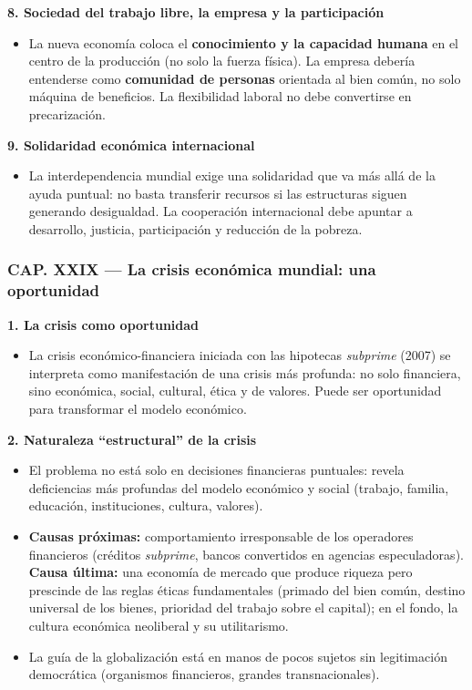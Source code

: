 \documentclass[10pt,a4paper]{article}
\begin{document}
\medskip\noindent \textbf{8. Sociedad del trabajo libre, la empresa y la participación}\par\nopagebreak
\begin{itemize}
\item La nueva economía coloca el \textbf{conocimiento y la capacidad humana} en el centro de la producción (no solo la fuerza física). La empresa debería entenderse como \textbf{comunidad de personas} orientada al bien común, no solo máquina de beneficios. La flexibilidad laboral no debe convertirse en precarización.
\end{itemize}

\medskip\noindent \textbf{9. Solidaridad económica internacional}\par\nopagebreak
\begin{itemize}
\item La interdependencia mundial exige una solidaridad que va más allá de la ayuda puntual: no basta transferir recursos si las estructuras siguen generando desigualdad. La cooperación internacional debe apuntar a desarrollo, justicia, participación y reducción de la pobreza.
\end{itemize}



\subsubsection{CAP. XXIX --- La crisis económica mundial: una oportunidad}

\medskip\noindent \textbf{1. La crisis como oportunidad}\par\nopagebreak
\begin{itemize}
\item La crisis económico-financiera iniciada con las hipotecas \textit{subprime} (2007) se interpreta como manifestación de una crisis más profunda: no solo financiera, sino económica, social, cultural, ética y de valores. Puede ser oportunidad para transformar el modelo económico.
\end{itemize}

\medskip\noindent \textbf{2. Naturaleza ``estructural'' de la crisis}\par\nopagebreak
\begin{itemize}
\item El problema no está solo en decisiones financieras puntuales: revela deficiencias más profundas del modelo económico y social (trabajo, familia, educación, instituciones, cultura, valores).
\item \textbf{Causas próximas:} comportamiento irresponsable de los operadores financieros (créditos \textit{subprime}, bancos convertidos en agencias especuladoras). \textbf{Causa última:} una economía de mercado que produce riqueza pero prescinde de las reglas éticas fundamentales (primado del bien común, destino universal de los bienes, prioridad del trabajo sobre el capital); en el fondo, la cultura económica neoliberal y su utilitarismo.
\item La guía de la globalización está en manos de pocos sujetos sin legitimación democrática (organismos financieros, grandes transnacionales).
\end{itemize}
\end{document}
